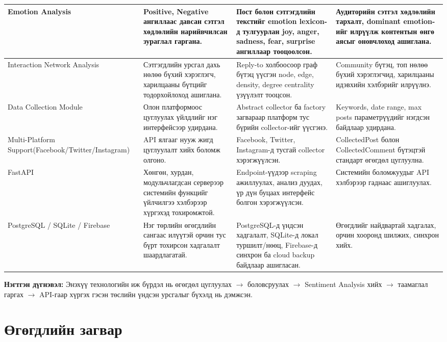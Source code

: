 \documentclass[12pt,a4paper]{report}
\begin{document}
\begin{landscape}
\begin{longtable}{|L{3.4cm}|L{4.6cm}|L{4.6cm}|L{8.8cm}|}
\hline
Emotion Analysis & Positive, Negative ангиллаас давсан сэтгэл хөдлөлийн нарийвчилсан зураглал гаргана. & Пост болон сэтгэгдлийн текстийг emotion lexicon-д тулгуурлан joy, anger, sadness, fear, surprise ангиллаар тооцоолсон. & Аудиторийн сэтгэл хөдлөлийн тархалт, dominant emotion-ийг илрүүлж контентын өнгө аясыг оновчлоход ашиглана. \\
\hline
Interaction Network Analysis & Сэтгэгдлийн урсгал дахь нөлөө бүхий хэрэглэгч, харилцааны бүтцийг тодорхойлоход ашиглана. & Reply-to холбоосоор граф бүтэц үүсгэн node, edge, density, degree centrality үзүүлэлт тооцсон. & Community бүтэц, топ нөлөө бүхий хэрэглэгчид, харилцааны идэвхийн хэлбэрийг илрүүлнэ. \\
\hline
Data Collection Module & Олон платформоос цуглуулах үйлдлийг нэг интерфейсээр удирдана. & Abstract collector ба factory загвараар платформ тус бүрийн collector-ийг үүсгэнэ. & Keywords, date range, max posts параметрүүдийг нэгдсэн байдлаар удирдана. \\
\hline
Multi-Platform Support\newline (Facebook/Twitter/Instagram) & API ялгааг нууж жигд цуглуулалт хийх боломж олгоно. & Facebook, Twitter, Instagram-д тусгай collector хэрэгжүүлсэн. & CollectedPost болон CollectedComment бүтэцтэй стандарт өгөгдөл цуглуулна. \\
\hline
FastAPI & Хөнгөн, хурдан, модульчлагдсан серверээр системийн функцийг үйлчилгээ хэлбэрээр хүргэхэд тохиромжтой. & Endpoint-үүдээр scraping ажиллуулах, анализ дуудах, үр дүн буцаах интерфейс болгон хэрэгжүүлсэн. & Системийн боломжуудыг API хэлбэрээр гаднаас ашиглуулах. \\
\hline
PostgreSQL / SQLite / Firebase & Нэг төрлийн өгөгдлийн сангаас илүүтэй орчин тус бүрт тохирсон хадгалалт шаардлагатай. & PostgreSQL-д үндсэн хадгалалт, SQLite-д локал туршилт/нөөц, Firebase-д синхрон ба cloud backup байдлаар ашигласан. & Өгөгдлийг найдвартай хадгалах, орчин хооронд шилжих, синхрон хийх. \\
\hline
\end{longtable}
\endgroup
\end{landscape}

\textbf{Нэгтгэн дүгнэвэл:} Энэхүү технологийн иж бүрдэл нь өгөгдөл цуглуулах $\rightarrow$ боловсруулах $\rightarrow$ Sentiment Analysis хийх $\rightarrow$ таамаглал гаргах $\rightarrow$ API-гаар хүргэх гэсэн төслийн үндсэн урсгалыг бүхэлд нь дэмжсэн.

\section{Өгөгдлийн загвар}
\end{document}
